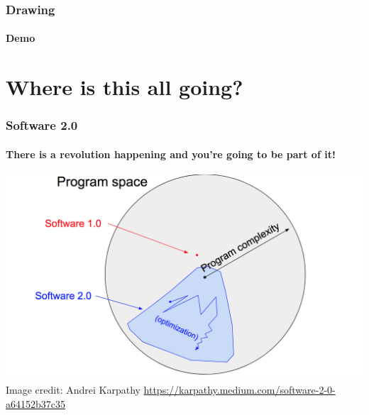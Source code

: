 \documentclass[]{article}
\begin{document}
\begin{frame}
\frametitle{Drawing}
\framesubtitle{Demo}

\end{frame}

\section{Where is this all going?}

\begin{frame}
\frametitle{Software 2.0}
\framesubtitle{There is a revolution happening and you're going to be part of it!}

\begin{center}
\includegraphics[scale=0.24]{software2_0}\\
Image credit: Andrei Karpathy \url{https://karpathy.medium.com/software-2-0-a64152b37c35}
\end{center}
\end{frame}

\end{document}
